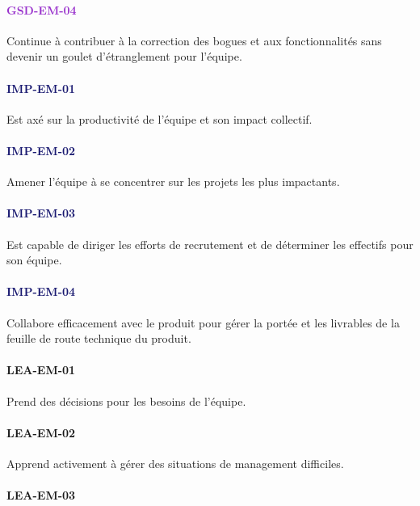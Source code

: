 \documentclass[a4paper, french, openany, 12pt]{book}
\newcommand\str[1]{\textcolor{DarkOrchid}{\textbf{\uppercase{gsd-{#1}}}}}
\newcommand\wis[1]{\textcolor{MidnightBlue}{\textbf{\uppercase{imp-{#1}}}}}
\newcommand\cha[1]{\textcolor{OliveGreen}{\textbf{\uppercase{lea-{#1}}}}}
\begin{document}
\begin{multicols}{2}
  \paragraph*{\str{em-04}}

  Continue à contribuer à la correction des bogues et aux fonctionnalités sans devenir un goulet d'étranglement pour 
  l'équipe.

  \paragraph*{\wis{em-01}}

  Est axé sur la productivité de l'équipe et son impact collectif.

  \paragraph*{\wis{em-02}}

  Amener l'équipe à se concentrer sur les projets les plus impactants.

  \paragraph*{\wis{em-03}}

  Est capable de diriger les efforts de recrutement et de déterminer les effectifs pour son équipe.
  
  \paragraph*{\wis{em-04}}

  Collabore efficacement avec le produit pour gérer la portée et les livrables de la feuille de route technique du 
  produit.

  \paragraph*{\cha{em-01}}

  Prend des décisions pour les besoins de l'équipe.
  
  \paragraph*{\cha{em-02}}

  Apprend activement à gérer des situations de management difficiles.

  \paragraph*{\cha{em-03}}
  

\end{multicols}
\end{document}
